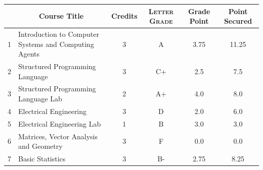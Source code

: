 \documentclass[11pt]{article}
\newcommand*{\numtwo}[1]{\pgfmathprintnumber[
                    fixed, precision=2, fixed zerofill=true]{#1}}
\begin{document}
                \begin{center}
                    \renewcommand{\arraystretch}{1.08}
                    
                \begin{tabular}{|c|l|c|>{\scshape}c|c|c|}
                \hline  \rule[-1ex]{0pt}{3.5ex} {\centering{\bf Course Code}} &  \multicolumn{1}{c|}{\textbf{Course Title}}  & {\bf Credits} & {\bf Letter Grade} & {\bf Grade Point} & {\bf Point Secured}  \\ 
                \hline   1 &  Introduction to Computer Systems and Computing Agents		 & 3 & A & 3.75 & 11.25 \\ %
                \hline   2 &  Structured Programming Language		 & 3 & C+ & 2.5 & 7.5 \\ %
                \hline   3 &  Structured Programming Language Lab		 & 2 & A+ & 4.0 & 8.0 \\ %
                \hline   4 &  Electrical Engineering		 & 3 & D & 2.0 & 6.0 \\ %
                \hline   5 &  Electrical Engineering Lab		 & 1 & B & 3.0 & 3.0 \\ %
                \hline   6 &  Matrices, Vector Analysis and Geometry		 & 3 & F & 0.0 & 0.0 \\ %
                \hline   7 &  Basic Statistics		 & 3 & B- & 2.75 & 8.25 \\ %

\hline                %
                \end{tabular}
                \end{center}
                \renewcommand{\arraystretch}{1.03}
\end{document}
